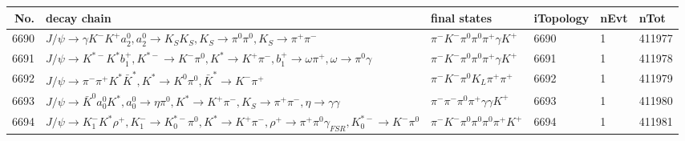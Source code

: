 \begin{table}[htbp] 
\begin{center}
\begin{small}
\begin{tabular}{rlllll}\hline\hline
 No. & decay chain & final states &  iTopology & nEvt & nTot \\\hline
6690&$J/\psi       \rightarrow \gamma       K^{-}          K^{+}          a_{2}^{0}      , a_{2}^{0}       \rightarrow K_{S}          K_{S}          , K_{S}           \rightarrow \pi^{0}        \pi^{0}        , K_{S}           \rightarrow \pi^{+}        \pi^{-}        $&$\pi^{-}        K^{-}          \pi^{0}        \pi^{0}        \pi^{+}        \gamma       K^{+}          $& 6690&    1&411977\\
6691&$J/\psi       \rightarrow K^{*-}         K^{*}          b_{1}^{+}      , K^{*-}          \rightarrow K^{-}          \pi^{0}        , K^{*}           \rightarrow K^{+}          \pi^{-}        , b_{1}^{+}       \rightarrow \omega         \pi^{+}        , \omega          \rightarrow \pi^{0}        \gamma       $&$\pi^{-}        K^{-}          \pi^{0}        \pi^{0}        \pi^{+}        \gamma       K^{+}          $& 6691&    1&411978\\
6692&$J/\psi       \rightarrow \pi^{-}        \pi^{+}        K^{*}          \bar{K}^{*}   , K^{*}           \rightarrow K^{0}          \pi^{0}        , \bar{K}^{*}    \rightarrow K^{-}          \pi^{+}        $&$\pi^{-}        K^{-}          \pi^{0}        K_{L}          \pi^{+}        \pi^{+}        $& 6692&    1&411979\\
6693&$J/\psi       \rightarrow \bar{K}^{0}   a_{0}^{0}      K^{*}          , a_{0}^{0}       \rightarrow \eta          \pi^{0}        , K^{*}           \rightarrow K^{+}          \pi^{-}        , K_{S}           \rightarrow \pi^{+}        \pi^{-}        , \eta           \rightarrow \gamma       \gamma       $&$\pi^{-}        \pi^{-}        \pi^{0}        \pi^{+}        \gamma       \gamma       K^{+}          $& 6693&    1&411980\\
6694&$J/\psi       \rightarrow K_{1}^{-}      K^{*}          \rho^{+}      , K_{1}^{-}       \rightarrow K_{0}^{*-}     \pi^{0}        , K^{*}           \rightarrow K^{+}          \pi^{-}        , \rho^{+}       \rightarrow \pi^{+}        \pi^{0}        \gamma_{FSR} , K_{0}^{*-}      \rightarrow K^{-}          \pi^{0}        $&$\pi^{-}        K^{-}          \pi^{0}        \pi^{0}        \pi^{0}        \pi^{+}        K^{+}          $& 6694&    1&411981\\

\end{tabular}
\end{small}
\end{center}
\end{table}
